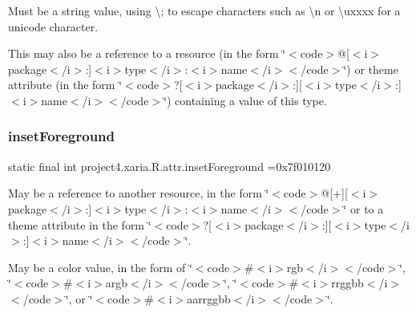 Must be a string value, using \textquotesingle{}\textbackslash{};\textquotesingle{} to escape characters such as \textquotesingle{}\textbackslash{}n\textquotesingle{} or \textquotesingle{}\textbackslash{}uxxxx\textquotesingle{} for a unicode character. 

This may also be a reference to a resource (in the form \char`\"{}$<$code$>$@\mbox{[}$<$i$>$package$<$/i$>$\+:\mbox{]}$<$i$>$type$<$/i$>$\+:$<$i$>$name$<$/i$>$$<$/code$>$\char`\"{}) or theme attribute (in the form \char`\"{}$<$code$>$?\mbox{[}$<$i$>$package$<$/i$>$\+:\mbox{]}\mbox{[}$<$i$>$type$<$/i$>$\+:\mbox{]}$<$i$>$name$<$/i$>$$<$/code$>$\char`\"{}) containing a value of this type. \mbox{\label{classproject4_1_1xaria_1_1R_1_1attr_a4cca428de0f7168bef296feabcf26bf2}} 
\subsubsection{\texorpdfstring{inset\+Foreground}{insetForeground}}
{\footnotesize\ttfamily static final int project4.\+xaria.\+R.\+attr.\+inset\+Foreground =0x7f010120\hspace{0.3cm}{\ttfamily [static]}}

May be a reference to another resource, in the form \char`\"{}$<$code$>$@\mbox{[}+\mbox{]}\mbox{[}$<$i$>$package$<$/i$>$\+:\mbox{]}$<$i$>$type$<$/i$>$\+:$<$i$>$name$<$/i$>$$<$/code$>$\char`\"{} or to a theme attribute in the form \char`\"{}$<$code$>$?\mbox{[}$<$i$>$package$<$/i$>$\+:\mbox{]}\mbox{[}$<$i$>$type$<$/i$>$\+:\mbox{]}$<$i$>$name$<$/i$>$$<$/code$>$\char`\"{}. 

May be a color value, in the form of \char`\"{}$<$code$>$\#$<$i$>$rgb$<$/i$>$$<$/code$>$\char`\"{}, \char`\"{}$<$code$>$\#$<$i$>$argb$<$/i$>$$<$/code$>$\char`\"{}, \char`\"{}$<$code$>$\#$<$i$>$rrggbb$<$/i$>$$<$/code$>$\char`\"{}, or \char`\"{}$<$code$>$\#$<$i$>$aarrggbb$<$/i$>$$<$/code$>$\char`\"{}. \mbox{\label{classproject4_1_1xaria_1_1R_1_1attr_a2b02532122bbdba09180807d9434842a}} 
